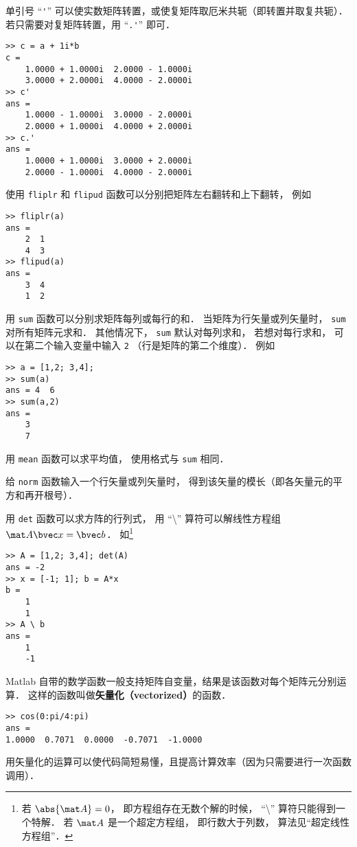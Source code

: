 单引号 “\lstinline|'|” 可以使实数矩阵转置，或使复矩阵取厄米共轭（即转置并取复共轭）．若只需要对复矩阵转置，用 “\lstinline|.'|” 即可．
\begin{lstlisting}[language=MatlabCom]
>> c = a + 1i*b
c =
    1.0000 + 1.0000i  2.0000 - 1.0000i
    3.0000 + 2.0000i  4.0000 - 2.0000i
>> c'
ans =
    1.0000 - 1.0000i  3.0000 - 2.0000i
    2.0000 + 1.0000i  4.0000 + 2.0000i
>> c.'
ans =
    1.0000 + 1.0000i  3.0000 + 2.0000i
    2.0000 - 1.0000i  4.0000 - 2.0000i
\end{lstlisting}
使用 \lstinline|fliplr| 和 \lstinline|flipud| 函数可以分别把矩阵左右翻转和上下翻转， 例如
\begin{lstlisting}[language=MatlabCom]
>> fliplr(a)
ans =
    2  1
    4  3
>> flipud(a)
ans =
    3  4
    1  2
\end{lstlisting}

用 \lstinline|sum| 函数可以分别求矩阵每列或每行的和． 当矩阵为行矢量或列矢量时， \lstinline|sum| 对所有矩阵元求和． 其他情况下， \lstinline|sum| 默认对每列求和， 若想对每行求和， 可以在第二个输入变量中输入 \lstinline|2| （行是矩阵的第二个维度）． 例如
\begin{lstlisting}[language=MatlabCom]
>> a = [1,2; 3,4];
>> sum(a)
ans = 4  6
>> sum(a,2)
ans =
    3
    7
\end{lstlisting}
用 \lstinline|mean| 函数可以求平均值， 使用格式与 \lstinline|sum| 相同．

给 \lstinline|norm| 函数输入一个行矢量或列矢量时， 得到该矢量的模长（即各矢量元的平方和再开根号）． 

用 \lstinline|det| 函数可以求方阵的行列式， 用 “\textbackslash” 算符可以解线性方程组%
 $\mat A \bvec x = \bvec b$． 如\footnote{若 $\abs{\mat A} = 0$， 即方程组存在无数个解的时候， “\textbackslash” 算符只能得到一个特解． 若 $\mat A$ 是一个超定方程组， 即行数大于列数， 算法见“超定线性方程组”．}
\begin{lstlisting}[language=MatlabCom]
>> A = [1,2; 3,4]; det(A)
ans = -2
>> x = [-1; 1]; b = A*x
b =
    1
    1
>> A \ b
ans =
    1
    -1
\end{lstlisting}

Matlab 自带的数学函数一般支持矩阵自变量，结果是该函数对每个矩阵元分别运算． 这样的函数叫做\textbf{矢量化（vectorized）}的函数．
\begin{lstlisting}[language=MatlabCom]
>> cos(0:pi/4:pi)
ans =
1.0000  0.7071  0.0000  -0.7071  -1.0000
\end{lstlisting}
用矢量化的运算可以使代码简短易懂，且提高计算效率（因为只需要进行一次函数调用）．

